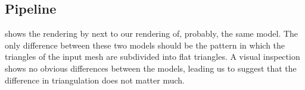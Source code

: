 \subsection{Pipeline}
	 shows the rendering by \citeauthor{vlachos2001curved} next to our rendering of, probably, the same model. The only difference between these two models should be the pattern in which the triangles of the input mesh are subdivided into flat triangles. A visual inspection shows no obvious differences between the models, leading us to suggest that the difference in triangulation does not matter much. 